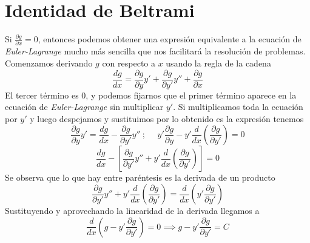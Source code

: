 \section{Identidad de Beltrami}

Si $\frac{\partial g}{\partial x} = 0$, entonces podemos obtener una expresión equivalente a la ecuación de \textit{Euler-Lagrange} mucho más sencilla que nos facilitará la resolución de problemas. Comenzamos derivando $g$ con respecto a $x$ usando la regla de la cadena
\[\frac{dg}{dx} = \frac{\partial g}{\partial y} y' + \frac{\partial g}{\partial y'}y'' + \frac{\partial g}{\partial x}\]
El tercer término es 0, y podemos fijarnos que el primer término aparece en la ecuación de \textit{Euler-Lagrange} sin multiplicar $y'$. Si multiplicamos toda la ecuación por $y'$ y luego despejamos y sustituimos por lo obtenido es la expresión tenemos
\[\frac{\partial g}{\partial y} y' = \frac{dg}{dx} - \frac{\partial g}{\partial y'}y'' \ ; \ \ \ \ \ \ y' \frac{\partial g}{\partial y} - y' \frac{d}{dx}\left(\frac{\partial g}{\partial y'}\right)=0\]
\[\frac{dg}{dx} - \left[\frac{\partial g}{\partial y'}y'' + y' \frac{d}{dx}\left(\frac{\partial g}{\partial y'}\right)\right]=0\]
Se observa que lo que hay entre paréntesis es la derivada de un producto
\[\frac{\partial g}{\partial y'}y'' + y' \frac{d}{dx}\left(\frac{\partial g}{\partial y'}\right) = \frac{d}{dx}\left(y' \frac{\partial g}{\partial y'}\right)\]
Sustituyendo y aprovechando la linearidad de la derivada llegamos a 
\[\frac{d}{dx}\left(g - y' \frac{\partial g}{\partial y'}\right)=0 \implies \boxed{g - y' \frac{\partial g}{\partial y'}= C}\]